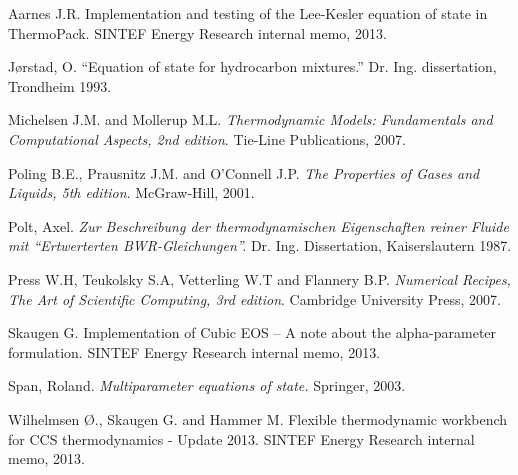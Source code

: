 \documentclass[english]{../thermomemo/thermomemo}
\numberwithin{equation}{section}
\begin{document}
\begin{thebibliography}{11}

 Aarnes J.R. Implementation and testing of the
  Lee-Kesler equation of state in ThermoPack. SINTEF Energy Research
  internal memo, 2013.

 Jørstad, O. ``Equation of state for hydrocarbon
  mixtures.'' Dr. Ing. dissertation, Trondheim 1993.

 Michelsen J.M. and Mollerup
  M.L. \textit{Thermodynamic Models: Fundamentals and Computational
    Aspects, 2nd edition}. Tie-Line Publications, 2007.

 Poling B.E., Prausnitz J.M. and O'Connell
  J.P. \textit{The Properties of Gases and Liquids, 5th
    edition}. McGraw-Hill, 2001.

 Polt, Axel. \textit{Zur Beschreibung der
    thermodynamischen Eigenschaften reiner Fluide mit ``Ertwerterten
    BWR-Gleichungen''.} Dr. Ing. Dissertation, Kaiserslautern
  1987. %

 Press W.H, Teukolsky S.A, Vetterling W.T and
  Flannery B.P. \textit{Numerical Recipes, The Art of Scientific
    Computing, 3rd edition}. Cambridge University Press, 2007.

 Skaugen G. Implementation of Cubic EOS -- A note
  about the alpha-parameter formulation. SINTEF Energy Research
  internal memo, 2013.

 Span, Roland. \textit{Multiparameter equations of
    state.} Springer, 2003.

 Wilhelmsen Ø., Skaugen G. and Hammer
  M. Flexible thermodynamic workbench for CCS thermodynamics - Update
  2013. SINTEF Energy Research internal memo, 2013.

\end{thebibliography}
\end{document}
